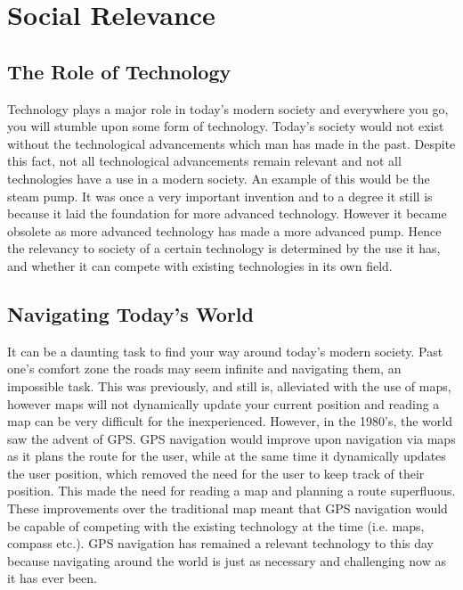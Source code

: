 \section{Social Relevance}
\subsection{The Role of Technology}
Technology plays a major role in today's modern society and everywhere you go, you will stumble upon some form of technology. Today's society would not exist without the technological advancements which man has made in the past. Despite this fact, not all technological advancements remain relevant and not all technologies have a use in a modern society. An example of this would be the steam pump. It was once a very important invention and to a degree it still is because it laid the foundation for more advanced technology. However it became obsolete as more advanced technology has made a more advanced pump. 
Hence the relevancy to society of a certain technology is determined by the use it has, and whether it can compete with existing technologies in its own field.

\subsection{Navigating Today's World}
It can be a daunting task to find your way around today's modern society. Past one's comfort zone the roads may seem infinite and navigating them, an impossible task. This was previously, and still is, alleviated with the use of maps, however maps will not dynamically update your current position and reading a map can be very difficult for the inexperienced. However, in the 1980's, the world saw the advent of GPS\cite{gps_advent}. GPS navigation would improve upon navigation via maps as it plans the route for the user, while at the same time it dynamically updates the user position, which removed the need for the user to keep track of their position. This made the need for reading a map and planning a route superfluous.\\
These improvements over the traditional map meant that GPS navigation would be capable of competing with the existing technology at the time (i.e. maps, compass etc.). GPS navigation has remained a relevant technology to this day because navigating around the world is just as necessary and challenging now as it has ever been.

